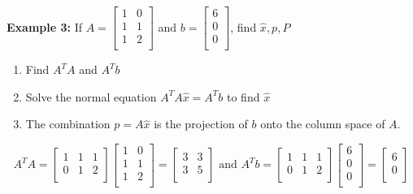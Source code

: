\textbf{Example 3:} If \(A = \begin{bmatrix}
    1 & 0  \\
    1 & 1  \\
    1 & 2  \\
\end{bmatrix}\) and \(b = \begin{bmatrix}
     6 \\
     0 \\
     0 \\
\end{bmatrix}\), find \(\hat{x}, p, P\)
\begin{enumerate}
    \item Find \(A^T A\) and \(A^T b\) 
    \item Solve the normal equation \(A^T A\hat{x} = A^T b\) to find \(\hat{x}\)
    \item The combination \(p = A\hat{x}\) is the projection of \(b\) onto the column space of \(A\).       
\end{enumerate}   
\[
    A^T A =
    \begin{bmatrix}
        1 & 1 & 1  \\
        0 & 1 & 2  \\
    \end{bmatrix}
    \begin{bmatrix}
        1 & 0  \\
        1 & 1  \\
        1 & 2   \\
    \end{bmatrix}
    = 
    \begin{bmatrix}
        3 & 3  \\
        3 & 5  \\
    \end{bmatrix}
    \text{ and }
    A^T b = 
    \begin{bmatrix}
        1 & 1 & 1  \\
        0 & 1 & 2  \\
    \end{bmatrix}
    \begin{bmatrix}
         6 \\
         0 \\
         0 \\
    \end{bmatrix}
    = 
    \begin{bmatrix}
         6 \\
         0 \\
    \end{bmatrix}
\]

